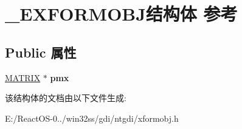\hypertarget{struct___e_x_f_o_r_m_o_b_j}{}\section{\+\_\+\+E\+X\+F\+O\+R\+M\+O\+B\+J结构体 参考}
\label{struct___e_x_f_o_r_m_o_b_j}
\subsection*{Public 属性}
\begin{DoxyCompactItemize}
\item 
\mbox{\label{struct___e_x_f_o_r_m_o_b_j_a766480fd5ed2c518595e2c223ad08a9e}} 
\hyperlink{struct_m_a_t_r_i_x}{M\+A\+T\+R\+IX} $\ast$ {\bfseries pmx}
\end{DoxyCompactItemize}


该结构体的文档由以下文件生成\+:\begin{DoxyCompactItemize}
\item 
E\+:/\+React\+O\+S-\/0../win32ss/gdi/ntgdi/xformobj.\+h\end{DoxyCompactItemize}
